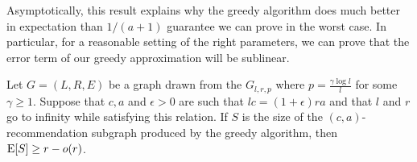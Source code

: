 Asymptotically, this result explains why the greedy
algorithm does much better in expectation than $1/(a+1)$ guarantee we
can prove in the worst case. In particular, for a reasonable setting of
the right parameters, we can prove that the error term of our greedy
approximation will be sublinear.

\begin{thm}
\label{simple-thm}
Let $G=(L,R,E)$ be a graph drawn from the $G_{l,r,p}$ where $p = \frac{\gamma \log l}{l}$ for some $\gamma \geq 1$. Suppose that $c, a$ and $\epsilon>0$ are such that $lc=(1+\epsilon)ra$ and that $l$ and $r$ go to infinity while satisfying this relation. If $S$ is the size of the $(c,a)$-recommendation subgraph produced by the greedy algorithm, then $ \text{E}[S] \geq r - o(r)$.
\end{thm}
%
%
%
%
%









